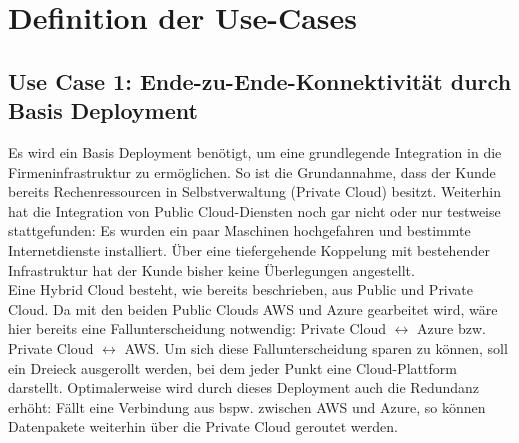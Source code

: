 \chapter{Definition der Use-Cases} \label{Defintion der Use-Cases}




\section{Use Case 1: Ende-zu-Ende-Konnektivität durch Basis Deployment}\label{base-deployment}

Es wird ein Basis Deployment benötigt, um eine grundlegende Integration in die Firmeninfrastruktur zu ermöglichen. So ist die Grundannahme, dass der Kunde bereits Rechenressourcen in Selbstverwaltung (\glqq Private Cloud\grqq{}) besitzt. Weiterhin hat die Integration von Public Cloud-Diensten noch gar nicht oder nur testweise stattgefunden: Es wurden ein paar Maschinen hochgefahren und bestimmte Internetdienste installiert. Über eine tiefergehende Koppelung mit bestehender Infrastruktur hat der Kunde bisher keine Überlegungen angestellt.\\
Eine Hybrid Cloud besteht, wie bereits beschrieben, aus Public und Private Cloud. Da mit den beiden Public Clouds AWS und Azure gearbeitet wird, wäre hier bereits eine Fallunterscheidung notwendig: Private Cloud $\leftrightarrow$ Azure bzw. Private Cloud $\leftrightarrow$ AWS. Um sich diese Fallunterscheidung sparen zu können, soll ein Dreieck ausgerollt werden, bei dem jeder Punkt eine Cloud-Plattform darstellt.
Optimalerweise wird durch dieses Deployment auch die Redundanz erhöht: Fällt eine Verbindung aus bspw. zwischen AWS und Azure, so können Datenpakete weiterhin über die Private Cloud geroutet werden.

